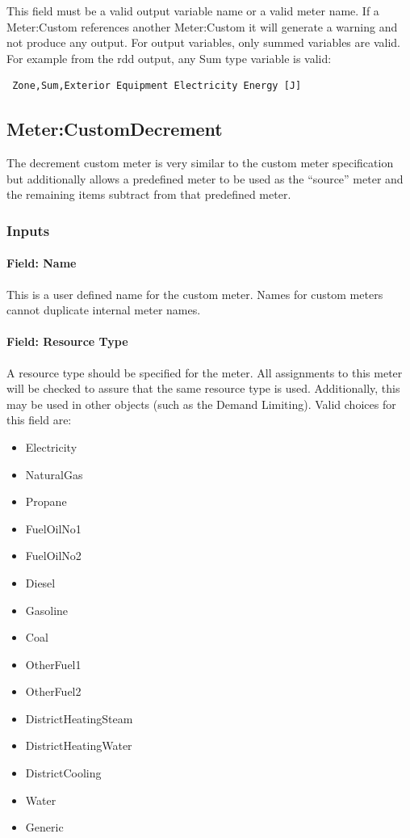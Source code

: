 This field must be a valid output variable name or a valid meter name. If a Meter:Custom references another Meter:Custom it will generate a warning and not produce any output.
For output variables, only summed variables are valid. For example from the rdd output, any Sum type variable is valid:
\begin{lstlisting}
 Zone,Sum,Exterior Equipment Electricity Energy [J]
\end{lstlisting}

\subsection{Meter:CustomDecrement}\label{metercustomdecrement}

The decrement custom meter is very similar to the custom meter specification but additionally allows a predefined meter to be used as the ``source'' meter and the remaining items subtract from that predefined meter.

\subsubsection{Inputs}\label{inputs-18-008}

\paragraph{Field: Name}\label{field-name-1-040}

This is a user defined name for the custom meter. Names for custom meters cannot duplicate internal meter names.

\paragraph{Field: Resource Type}\label{field-fuel-type-1-003}

A resource type should be specified for the meter. All assignments to this meter will be checked to assure that the same resource type is used. Additionally, this may be used in other objects (such as the Demand Limiting). Valid choices for this field are:

\begin{itemize}
    \item
    Electricity
    \item
    NaturalGas
    \item
    Propane
    \item
    FuelOilNo1
    \item
    FuelOilNo2
    \item
    Diesel
    \item
    Gasoline
    \item
    Coal
    \item
    OtherFuel1
    \item
    OtherFuel2
    \item
    DistrictHeatingSteam
    \item
    DistrictHeatingWater
    \item
    DistrictCooling
    \item
    Water
    \item
    Generic
\end{itemize}

